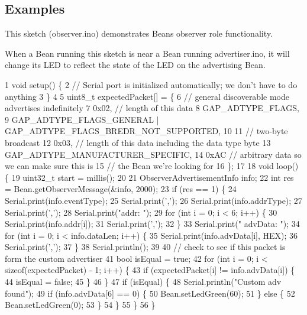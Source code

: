 \subsection*{Examples}

This sketch (observer.\+ino) demonstrates Bean\textquotesingle{}s observer role functionality.

When a Bean running this sketch is near a Bean running advertiser.\+ino, it will change its L\+E\+D to reflect the state of the L\+E\+D on the advertising Bean.


\begin{DoxyCodeInclude}
1 void setup() \{
2   // Serial port is initialized automatically; we don't have to do anything
3 \}
4 
5 uint8\_t expectedPacket[] = \{
6     // general discoverable mode advertises indefinitely
7     0x02,  // length of this data
8     GAP\_ADTYPE\_FLAGS,
9     GAP\_ADTYPE\_FLAGS\_GENERAL | GAP\_ADTYPE\_FLAGS\_BREDR\_NOT\_SUPPORTED,
10 
11     // two-byte broadcast
12     0x03,  // length of this data including the data type byte
13     GAP\_ADTYPE\_MANUFACTURER\_SPECIFIC,
14     0xAC  // arbitrary data so we can make sure this is
15           // the Bean we're looking for
16 \};
17 
18 void loop() \{
19   uint32\_t start = millis();
20 
21   ObserverAdvertisementInfo info;
22   int res = Bean.getObserverMessage(&info, 2000);
23   if (res == 1) \{
24     Serial.print(info.eventType);
25     Serial.print(',');
26     Serial.print(info.addrType);
27     Serial.print(',');
28     Serial.print("addr: ");
29     for (int i = 0; i < 6; i++) \{
30       Serial.print(info.addr[i]);
31       Serial.print(',');
32     \}
33     Serial.print("  advData: ");
34     for (int i = 0; i < info.dataLen; i++) \{
35       Serial.print(info.advData[i], HEX);
36       Serial.print(',');
37     \}
38     Serial.println();
39 
40     // check to see if this packet is form the custom advertiser
41     bool isEqual = true;
42     for (int i = 0; i < sizeof(expectedPacket) - 1; i++) \{
43       if (expectedPacket[i] != info.advData[i]) \{
44         isEqual = false;
45       \}
46     \}
47     if (isEqual) \{
48       Serial.println("Custom adv found");
49       if (info.advData[6] == 0) \{
50         Bean.setLedGreen(60);
51       \} else \{
52         Bean.setLedGreen(0);
53       \}
54     \}
55   \}
56 \}
\end{DoxyCodeInclude}
 \hypertarget{class_bean_class_ae2547ba8f4b67a9ac774ce6d89b14dcb}{}
